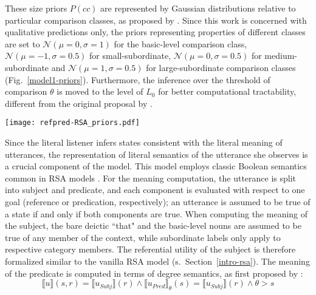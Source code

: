 These size priors $P(cc)$ are represented by Gaussian distributions relative to particular comparison classes, as proposed by \textcite{tessler2017warm}. Since this work is concerned with qualitative predictions only, the priors representing properties of different classes are set to $\mathcal{N}(\mu = 0, \sigma = 1)$ for the basic-level comparison class, $\mathcal{N}(\mu = -1, \sigma = 0.5)$ for small-subordinate, $\mathcal{N}(\mu = 0, \sigma = 0.5)$ for medium-subordinate and $\mathcal{N}(\mu = 1, \sigma = 0.5)$ for large-subordinate comparison classes (Fig.~\ref{model1-priors}). 
Furthermore, the inference over the threshold of comparison $\theta$ is moved to the level of $L_0$ for better computational tractability, different from the original proposal by \textcite{lassiter2013context}.
\begin{figure*}[t]
	\begin{center}
		\texttt{[image: refpred-RSA\_priors.pdf]}
	\end{center}
	\vspace{-0.3cm}
	\caption{Hypothetical prior size distributions over a basic-level (dogs), a small-subordinate(chihuahua), a medium-subordinate (poodle) and a large-subordinate (Great Dane) category. These distributions were used for qualitative tests of the Refpred-RSA model.}
	\label{model1-priors}
\end{figure*}

Since the literal listener infers states consistent with the literal meaning of utterances, the representation of literal semantics of the utterance she observes is a crucial component of the model. This model employs classic Boolean semantics common in RSA models \parencite{montague1973proper, problang}. For the meaning computation, the utterance is split into subject and predicate, and each component is evaluated with respect to one goal (reference or predication, respectively); an utterance is assumed to be true of a state if and only if both components are true.  When computing the meaning of the subject, the bare deictic ``that" and the basic-level nouns are assumed to be true of any member of the context, while subordinate labels only apply to respective category members. The referential utility of the subject is therefore formalized similar to the vanilla RSA model (s.~Section~\ref{intro-rsa}). The meaning of the predicate is computed in terms of degree semantics, as first proposed by \textcite{lassiter2013context}: 
\begin{equation}
\llbracket u \rrbracket (s, r) = \llbracket u_{Subj} \rrbracket (r) \land \llbracket u_{Pred} \rrbracket_{\theta} (s) = \llbracket u_{Subj} \rrbracket (r) \land \theta > s
\end{equation}
  
